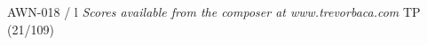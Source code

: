 \documentclass[11pt]{report}
\begin{document}
\null \vfill

AWN-018 / l \hfill
\textit{Scores available from the composer at www.trevorbaca.com}
\hfill TP (21/109)
\end{document}
